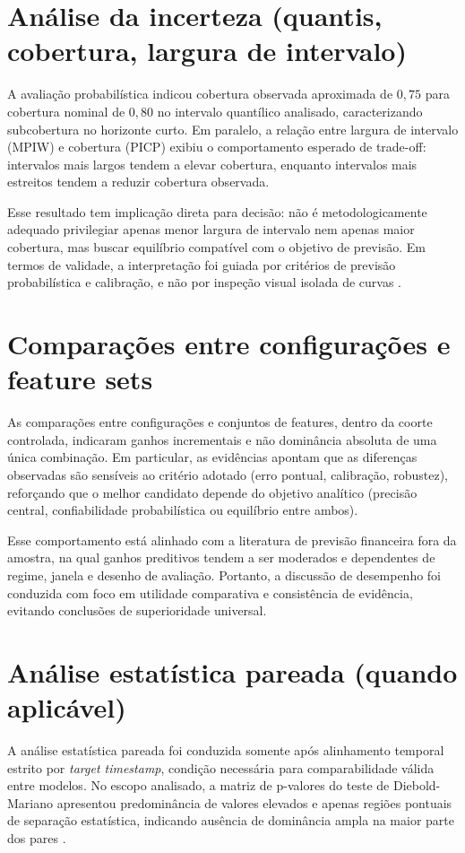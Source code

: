 \section{Análise da incerteza (quantis, cobertura, largura de intervalo)}
A avaliação probabilística indicou cobertura observada aproximada de \(0{,}75\) para cobertura nominal de \(0{,}80\) no intervalo quantílico analisado, caracterizando subcobertura no horizonte curto. Em paralelo, a relação entre largura de intervalo (MPIW) e cobertura (PICP) exibiu o comportamento esperado de trade-off: intervalos mais largos tendem a elevar cobertura, enquanto intervalos mais estreitos tendem a reduzir cobertura observada.

Esse resultado tem implicação direta para decisão: não é metodologicamente adequado privilegiar apenas menor largura de intervalo nem apenas maior cobertura, mas buscar equilíbrio compatível com o objetivo de previsão. Em termos de validade, a interpretação foi guiada por critérios de previsão probabilística e calibração, e não por inspeção visual isolada de curvas \cite{GNEITING2007}.

\section{Comparações entre configurações e feature sets}
As comparações entre configurações e conjuntos de features, dentro da coorte controlada, indicaram ganhos incrementais e não dominância absoluta de uma única combinação. Em particular, as evidências apontam que as diferenças observadas são sensíveis ao critério adotado (erro pontual, calibração, robustez), reforçando que o melhor candidato depende do objetivo analítico (precisão central, confiabilidade probabilística ou equilíbrio entre ambos).

Esse comportamento está alinhado com a literatura de previsão financeira fora da amostra, na qual ganhos preditivos tendem a ser moderados e dependentes de regime, janela e desenho de avaliação. Portanto, a discussão de desempenho foi conduzida com foco em utilidade comparativa e consistência de evidência, evitando conclusões de superioridade universal.

\section{Análise estatística pareada (quando aplicável)}
A análise estatística pareada foi conduzida somente após alinhamento temporal estrito por \textit{target timestamp}, condição necessária para comparabilidade válida entre modelos. No escopo analisado, a matriz de p-valores do teste de Diebold-Mariano apresentou predominância de valores elevados e apenas regiões pontuais de separação estatística, indicando ausência de dominância ampla na maior parte dos pares \cite{DIEBOLDMARIANO1995}.

